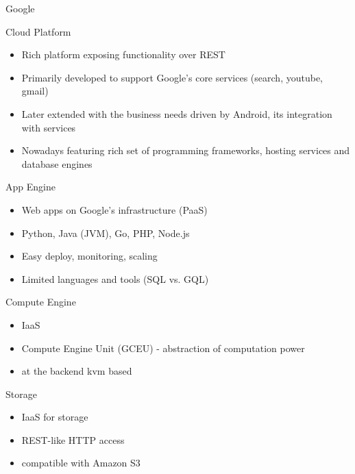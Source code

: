 \documentclass[presentation]{beamer}
\begin{document}
\begin{frame}[label={sec:org370a00e}]{Google}
\end{frame}

\begin{frame}[label={sec:org32b7a10}]{Cloud Platform}
\begin{itemize}
\item Rich platform exposing functionality over REST
\item Primarily developed to support Google's core services (search, youtube, gmail)
\item Later extended with the business needs driven by Android, its integration with services
\item Nowadays featuring rich set of programming frameworks, hosting services and database engines
\end{itemize}
\end{frame}

\begin{frame}[label={sec:org2ca57da}]{App Engine}
\begin{itemize}
\item Web apps on Google's infrastructure (PaaS)
\item Python, Java (JVM), Go, PHP, Node.js
\item Easy deploy, monitoring, scaling
\item Limited languages and tools (SQL vs. GQL)
\end{itemize}
\end{frame}

\begin{frame}[label={sec:org5cd3470}]{Compute Engine}
\begin{itemize}
\item IaaS
\item Compute Engine Unit (GCEU) - abstraction of computation power
\item at the backend kvm based
\end{itemize}
\end{frame}

\begin{frame}[label={sec:orgbbdfc86}]{Storage}
\begin{itemize}
\item IaaS for storage
\item REST-like HTTP access
\item compatible with Amazon S3
\end{itemize}
\end{frame}
\end{document}
